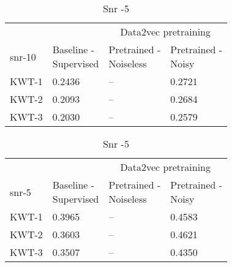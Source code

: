 \begin{table}[ht]
    \centering
    \begin{subtable}[ht]{0.45\textwidth}
        \centering
        \begin{tabular}{@{}llll@{}}
        \toprule
        & & \multicolumn{2}{c}{Data2vec pretraining} \\ \cline{3-4}
        snr-10    & \makecell{ Baseline - \\ Supervised } & \makecell{ Pretrained - \\ Noiseless } & \makecell{ Pretrained - \\ Noisy } \\ \midrule
        KWT-1    & 0.2436  & -- & 0.2721 \\
        KWT-2    & 0.2093  & -- & 0.2684 \\
        KWT-3    & 0.2030  & -- & 0.2579 \\
        \bottomrule
        \end{tabular}
        \caption{Snr -10}
    \end{subtable}
    \hfill
    \begin{subtable}[ht]{0.45\textwidth}
        \centering
        \begin{tabular}{@{}llll@{}}
        \toprule
        & & \multicolumn{2}{c}{Data2vec pretraining} \\ \cline{3-4}
        snr-5    & \makecell{ Baseline - \\ Supervised } & \makecell{ Pretrained - \\ Noiseless } & \makecell{ Pretrained - \\ Noisy } \\ \midrule
        KWT-1    & 0.3965  & -- & 0.4583 \\
        KWT-2    & 0.3603  & -- & 0.4621 \\
        KWT-3    & 0.3507  & -- & 0.4350 \\
        \bottomrule
        \end{tabular}
        \caption{Snr -5}
    \end{subtable}
     
     
    \bigskip



\end{table}

